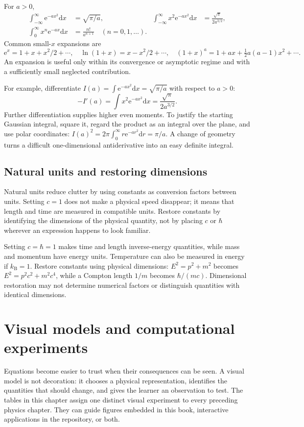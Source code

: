 \documentclass[11pt,oneside]{book}
\newcommand{\dd}{\mathrm{d}}
\newcommand{\ee}{\mathrm{e}}
\newcommand{\kb}{k_{\mathrm B}}
\theoremstyle{reviewstyle}
\begin{document}
For $a>0$,
\begin{align}
\int_{-\infty}^{\infty}\ee^{-ax^2}\dd x&=\sqrt{\pi/a},&
\int_{-\infty}^{\infty}x^2\ee^{-ax^2}\dd x&=\frac{\sqrt\pi}{2a^{3/2}},\\
\int_0^\infty x^n\ee^{-ax}\dd x&=\frac{n!}{a^{n+1}}\quad(n=0,1,\ldots).&&
\end{align}
Common small-$x$ expansions are
\begin{equation}\ee^x=1+x+x^2/2+\cdots,\quad \ln(1+x)=x-x^2/2+\cdots,\quad (1+x)^a=1+ax+\tfrac12a(a-1)x^2+\cdots.\end{equation}
An expansion is useful only within its convergence or asymptotic regime and with a sufficiently small neglected contribution.

For example, differentiate $I(a)=\int\ee^{-ax^2}\dd x=\sqrt{\pi/a}$ with respect to $a>0$:
\begin{equation}
-I'(a)=\int x^2\ee^{-ax^2}\dd x=\frac{\sqrt\pi}{2a^{3/2}}.
\end{equation}
Further differentiation supplies higher even moments. To justify the starting Gaussian integral, square it, regard the product as an integral over the plane, and use polar coordinates: $I(a)^2=2\pi\int_0^\infty r\ee^{-ar^2}\dd r=\pi/a$. A change of geometry turns a difficult one-dimensional antiderivative into an easy definite integral.

\section{Natural units and restoring dimensions}
Natural units reduce clutter by using constants as conversion factors between units. Setting $c=1$ does not make a physical speed disappear; it means that length and time are measured in compatible units. Restore constants by identifying the dimensions of the physical quantity, not by placing $c$ or $\hbar$ wherever an expression happens to look familiar.

Setting $c=\hbar=1$ makes time and length inverse-energy quantities, while mass and momentum have energy units. Temperature can also be measured in energy if $\kb=1$. Restore constants using physical dimensions: $E^2=p^2+m^2$ becomes $E^2=p^2c^2+m^2c^4$, while a Compton length $1/m$ becomes $\hbar/(mc)$. Dimensional restoration may not determine numerical factors or distinguish quantities with identical dimensions.

\chapter{Visual models and computational experiments}
Equations become easier to trust when their consequences can be seen. A visual model is not decoration: it chooses a physical representation, identifies the quantities that should change, and gives the learner an observation to test. The tables in this chapter assign one distinct visual experiment to every preceding physics chapter. They can guide figures embedded in this book, interactive applications in the repository, or both.
\end{document}
